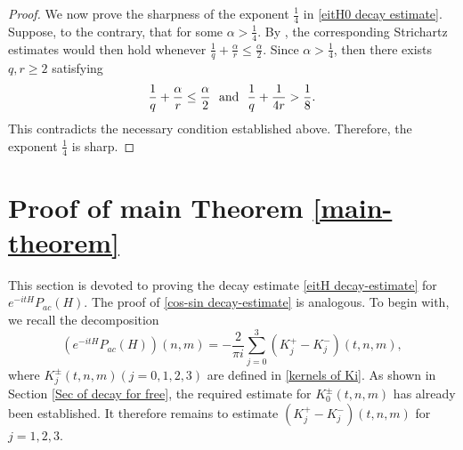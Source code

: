 \documentclass[reqno, 11pt]{amsart}
\numberwithin{equation}{section}
\begin{document}
\begin{proof}
We now prove the sharpness of the exponent $\frac14$ in
\eqref{eitH0 decay estimate}. Suppose, to the contrary, that for some
$\alpha>\frac14$. By \cite[Theorem 1.2]{KT98}, the corresponding Strichartz estimates
would then hold whenever $\frac{1}{q}+\frac{\alpha}{r}\leq\frac{\alpha}{2}$. Since $\alpha>\frac{1}{4}$, then there exists $q,r\geq2$ satisfying
\begin{equation*}
\frac{1}{q}+\frac{\alpha}{r}\leq\frac{\alpha}{2}\ \ {\rm and}\ \ \frac{1}{q}+\frac{1}{4r}>\frac{1}{8}.
\end{equation*}
This contradicts the necessary condition established above. Therefore, the exponent $\frac14$ is sharp.
\end{proof}
\section{Proof of main Theorem \ref{main-theorem}}\label{sec of proof}
This section is devoted to proving the decay estimate \eqref{eitH decay-estimate} for $e^{-itH}P_{ac}(H)$. The proof of \eqref{cos-sin decay-estimate} is analogous.
To begin with, we recall the decomposition
\begin{equation}\label{kernel of eitHPacH(4 section)1}
(e^{-itH}P_{ac}(H))(n,m)=-\frac{2}{\pi i}\sum\limits_{j=0}^{3}(K^{+}_{j}-K^{-}_{j})(t,n,m),
\end{equation}
where $K^{\pm}_{j}(t,n,m)(j=0,1,2,3)$ are defined in \eqref{kernels of Ki}.
As shown in Section \ref{Sec of decay for free}, the required estimate for $K^{\pm}_0(t,n,m)$ has already been established. It therefore remains to estimate $(K_j^+-K_j^-)(t,n,m)$ for $j=1,2,3$.
\end{document}
